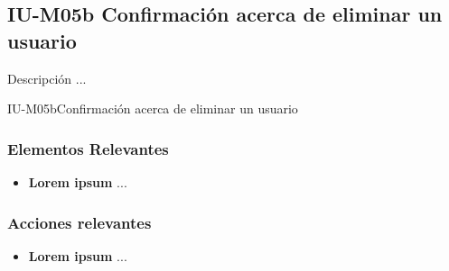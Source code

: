 
\subsection{IU-M05b Confirmación acerca de eliminar un usuario}

 Descripción ...

        {IU-M05b}{Confirmación acerca de eliminar un usuario}

\subsubsection{Elementos Relevantes}

    \begin{itemize}
    \item {\bf Lorem ipsum}
        ...
    \end{itemize}

\subsubsection{Acciones relevantes}

    \begin{itemize}
    \item {\bf Lorem ipsum}
        ...
    \end{itemize}

\clearpage
